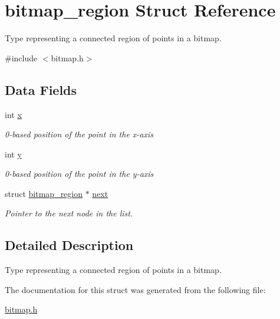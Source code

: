 \hypertarget{structbitmap__region}{
\section{bitmap\_\-region Struct Reference}
\label{structbitmap__region}
}


Type representing a connected region of points in a bitmap.  




{\ttfamily \#include $<$bitmap.h$>$}

\subsection*{Data Fields}
\begin{DoxyCompactItemize}
\item 
\hypertarget{structbitmap__region_ac1164a5047b0c9ace92478c836d16657}{
int \hyperlink{structbitmap__region_ac1164a5047b0c9ace92478c836d16657}{x}}
\label{structbitmap__region_ac1164a5047b0c9ace92478c836d16657}

\begin{DoxyCompactList}\small\item\em 0-\/based position of the point in the x-\/axis \end{DoxyCompactList}\item 
\hypertarget{structbitmap__region_ab8ce59ebe777199ba383a2e1d0d18f8b}{
int \hyperlink{structbitmap__region_ab8ce59ebe777199ba383a2e1d0d18f8b}{y}}
\label{structbitmap__region_ab8ce59ebe777199ba383a2e1d0d18f8b}

\begin{DoxyCompactList}\small\item\em 0-\/based position of the point in the y-\/axis \end{DoxyCompactList}\item 
\hypertarget{structbitmap__region_a0be812fb867e945ccfde9c5c7eb3bf9b}{
struct \hyperlink{structbitmap__region}{bitmap\_\-region} $\ast$ \hyperlink{structbitmap__region_a0be812fb867e945ccfde9c5c7eb3bf9b}{next}}
\label{structbitmap__region_a0be812fb867e945ccfde9c5c7eb3bf9b}

\begin{DoxyCompactList}\small\item\em Pointer to the next node in the list. \end{DoxyCompactList}\end{DoxyCompactItemize}


\subsection{Detailed Description}
Type representing a connected region of points in a bitmap. 

The documentation for this struct was generated from the following file:\begin{DoxyCompactItemize}
\item 
\hyperlink{bitmap_8h}{bitmap.h}\end{DoxyCompactItemize}
